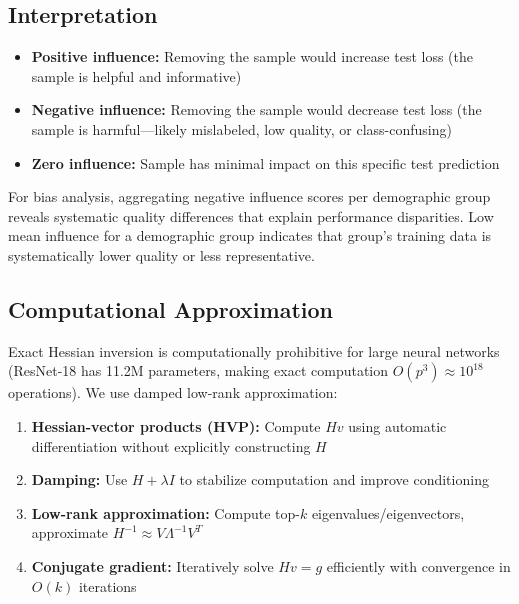 \documentclass[11pt,a4paper,oneside]{report}
\begin{document}
\subsection{Interpretation}

\begin{itemize}

\item \textbf{Positive influence:} Removing the sample would increase test loss (the sample is helpful and informative)

\item \textbf{Negative influence:} Removing the sample would decrease test loss (the sample is harmful---likely mislabeled, low quality, or class-confusing)

\item \textbf{Zero influence:} Sample has minimal impact on this specific test prediction

\end{itemize}

For bias analysis, aggregating negative influence scores per demographic group reveals systematic quality differences that explain performance disparities. Low mean influence for a demographic group indicates that group's training data is systematically lower quality or less representative.

\subsection{Computational Approximation}

Exact Hessian inversion is computationally prohibitive for large neural networks (ResNet-18 has 11.2M parameters, making exact computation \(O(p^3) \approx 10^{18}\) operations). We use damped low-rank approximation:

\begin{enumerate}

\item \textbf{Hessian-vector products (HVP):} Compute \(H v\) using automatic differentiation without explicitly constructing \(H\)

\item \textbf{Damping:} Use \(H + \lambda I\) to stabilize computation and improve conditioning

\item \textbf{Low-rank approximation:} Compute top-\(k\) eigenvalues/eigenvectors, approximate \(H^{-1} \approx V \Lambda^{-1} V^T\)

\item \textbf{Conjugate gradient:} Iteratively solve \(H v = g\) efficiently with convergence in \(O(k)\) iterations

\end{enumerate}
\end{document}
